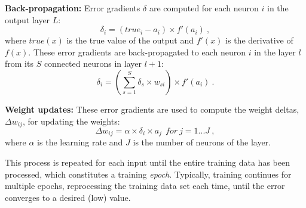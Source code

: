 {\bf Back-propagation:}
Error gradients $\delta$ are computed for each neuron $i$ in the output layer $L$:
\begin{equation}
\delta_{i} = \left(true_{i} - a_{i}\right) \times f'(a_{i})\ ,
\label{eqn:output_error_term}
\end{equation}
where $true(x)$ is the true value of the output and $f'(x)$ is the derivative of $f(x)$.
These error gradients are back-propagated to each neuron $i$ in the layer $l$ from its $S$ connected neurons in layer $l+1$:
\begin{equation}
\delta_{i} = \left(\sum\limits_{s=1}^{S}\delta_{s} \times w_{si}\right) \times f'(a_{i}) \ .
\label{eqn:other_error_term}
\end{equation}

{\bf Weight updates:}
These error gradients are used to compute the weight deltas, $\Delta w_{ij}$, for updating the weights:
\begin{equation}
\Delta w_{ij} = \alpha \times \delta_{i} \times a_{j} ~~for~ j = 1...J \ ,
\label{eqn:weight_delta}
\end{equation}
where $\alpha$ is the learning rate and $J$ is the number of neurons of the layer.  

This process is repeated for each input until the entire training data has been processed, which constitutes a training {\it epoch}. Typically, training continues for multiple epochs, reprocessing the training data set each time, until the error converges to a desired (low) value.
